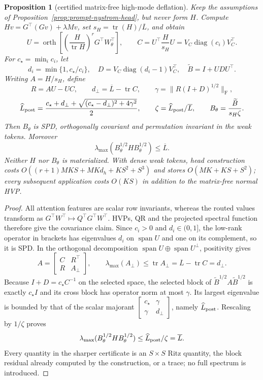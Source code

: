 \documentclass[11pt]{article}
\newtheorem{proposition}{Proposition}
\newcommand{\R}{\mathbb R}
\begin{document}
\begin{proposition}[certified matrix-free high-mode deflation]
\label{prop:matrix-free-prompt-head}
Keep the assumptions of Proposition~\ref{prop:prompt-nystrom-head}, but never
form $H$.  Compute $Hv=G^\top(Gv)+\lambda Mv$, set
$s_H=\operatorname{tr}(H)/\overline L$, and obtain
\[
 U=\operatorname{orth}\!\left[
 \left(\frac{H}{\operatorname{tr}H}\right)^rG^\top W_\theta^\top
 \right],
 \qquad
 C=U^\top\frac{H}{s_H}U
   =V_C\operatorname{diag}(c_i)V_C^\top.
\]
For $c_\star=\min_i c_i$, let
\[
 d_i=\min\{1,c_\star/c_i\},
 \quad
 D=V_C\operatorname{diag}(d_i-1)V_C^\top,
 \quad
 \widetilde B=I+UDU^\top.
\]
Writing $A=H/s_H$, define
\[
 R=AU-UC,
 \qquad
 d_\perp=\overline L-\operatorname{tr}C,
 \qquad
 \gamma=\|R(I+D)^{1/2}\|_{\mathrm F},
\]
\[
 \widehat L_{\rm post}
 =\frac{c_\star+d_\perp+
 \sqrt{(c_\star-d_\perp)^2+4\gamma^2}}{2},
 \qquad
 \zeta=\widehat L_{\rm post}/\overline L,
 \qquad
 B_\theta=\frac{\widetilde B}{s_H\zeta}.
\]
Then $B_\theta$ is SPD, orthogonally covariant and permutation invariant in
the weak tokens.  Moreover
\[
 \lambda_{\max}(B_\theta^{1/2}HB_\theta^{1/2})
 \leq\overline L.
\]
Neither $H$ nor $B_\theta$ is materialized.  With dense weak tokens, head
construction costs $O((r+1)MKS+MKd_h+KS^2+S^3)$ and stores
$O(MK+KS+S^2)$; every subsequent application costs $O(KS)$ in addition to
the matrix-free normal HVP.
\end{proposition}
\begin{proof}
All attention features are scalar row invariants, whereas the routed values
transform as $G^\top W^\top\mapsto Q^\top G^\top W^\top$.  HVPs, QR and the
projected spectral function therefore give the covariance claim.  Since
$c_i>0$ and $d_i\in(0,1]$, the low-rank operator in brackets has eigenvalues
$d_i$ on $\operatorname{span}U$ and one on its complement, so it is SPD.
In the orthogonal decomposition
$\operatorname{span}U\oplus\operatorname{span}U^\perp$, positivity gives
\[
 A=\begin{bmatrix}C&R^\top\\R&A_\perp\end{bmatrix},
 \qquad
 \lambda_{\max}(A_\perp)
 \leq\operatorname{tr}A_\perp
 =\overline L-\operatorname{tr}C=d_\perp.
\]
Because $I+D=c_\star C^{-1}$ on the selected space, the selected block of
$\widetilde B^{1/2}A\widetilde B^{1/2}$ is exactly $c_\star I$ and its cross
block has operator norm at most $\gamma$.  Its largest eigenvalue is bounded
by that of the scalar majorant
$\begin{bmatrix}c_\star&\gamma\\
\gamma&d_\perp\end{bmatrix}$, namely
$\widehat L_{\rm post}$.  Rescaling by $1/\zeta$ proves
\[
 \lambda_{\max}(B_\theta^{1/2}HB_\theta^{1/2})
 \leq\widehat L_{\rm post}/\zeta=\overline L.
\]
Every quantity in the sharper certificate is an $S\times S$ Ritz
quantity, the block residual already computed by the construction, or a
trace; no full spectrum is introduced.
\end{proof}
\end{document}
